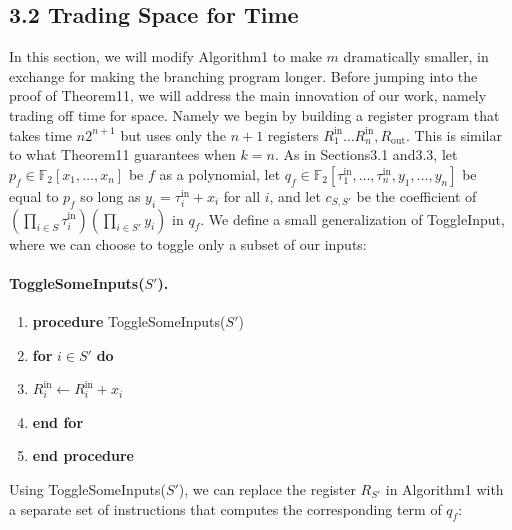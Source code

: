 \subsection*{3.2 Trading Space for Time}
In this section, we will modify Algorithm1 to make $m$ dramatically smaller, in exchange for making the branching program longer.
Before jumping into the proof of Theorem11, we will address the main innovation of our work, namely trading off time for space. Namely we begin by building a register program that takes time $n2^{n+1}$ but uses only the $n+1$ registers $R_1^{\mathrm{in}}\ldots R_n^{\mathrm{in}},R_{\mathrm{out}}$. This is similar to what Theorem11 guarantees when $k=n$.
As in Sections3.1 and3.3, let $p_f\in\mathbb F_2[x_1,\ldots,x_n]$ be $f$ as a polynomial, let $q_f\in\mathbb F_2[\tau_1^{\mathrm{in}},\ldots,\tau_n^{\mathrm{in}},y_1,\ldots,y_n]$ be equal to $p_f$ so long as $y_i=\tau_i^{\mathrm{in}}+x_i$ for all $i$, and let $c_{S,S'}$ be the coefficient of $(\prod_{i\in S}\tau_i^{\mathrm{in}})(\prod_{i\in S'}y_i)$ in $q_f$. We define a small generalization of ToggleInput, where we can choose to toggle only a subset of our inputs:
\paragraph{ToggleSomeInputs($S'$).}
\begin{enumerate}[label=\arabic*:]
\item \textbf{procedure} ToggleSomeInputs($S'$)
\item \textbf{for} $i\in S'$ \textbf{do}
\item $R_i^{\mathrm{in}}\leftarrow R_i^{\mathrm{in}}+x_i$
\item \textbf{end for}
\item \textbf{end procedure}
\end{enumerate}
Using ToggleSomeInputs($S'$), we can replace the register $R_{S'}$ in Algorithm1 with a separate set of instructions that computes the corresponding term of $q_f$:
